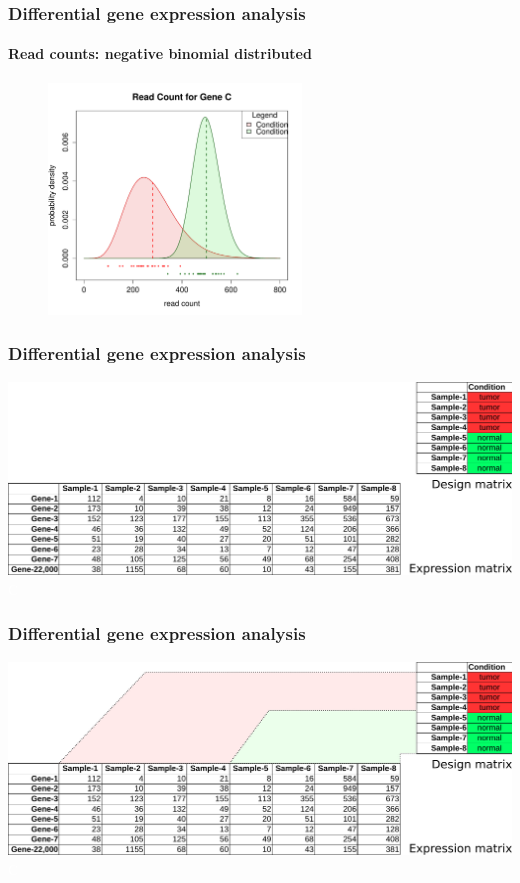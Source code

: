 \documentclass{beamer}			  %
\begin{document}
\begin{frame}
\frametitle{Differential gene expression analysis}
\framesubtitle{Read counts: negative binomial distributed}
	\begin{figure}
		\includegraphics[width=0.60\textwidth]{figures/dge_10bp.pdf}
	\end{figure}
\end{frame}


\begin{frame}
	\frametitle{Differential gene expression analysis}
		\includegraphics[width=\textwidth]{figures/dge_11ap.pdf} \\
	\textcolor{white}{C}
\end{frame}

\begin{frame}
	\frametitle{Differential gene expression analysis}
		\includegraphics[width=\textwidth]{figures/dge_11bp.pdf} \\
	\textcolor{white}{C}
\end{frame}
\end{document}
